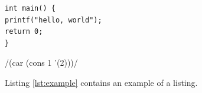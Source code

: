 \documentclass{article}
\begin{document}
\begin{verbatim}
int main() {
printf("hello, world");
return 0;
}
\end{verbatim}

\begin{listing}[H]
/(car (cons 1 ’(2)))/
\caption{Example of a listing.}
\label{lst:example}
\end{listing}
Listing \ref{lst:example} contains an example of a listing.
\end{document}
